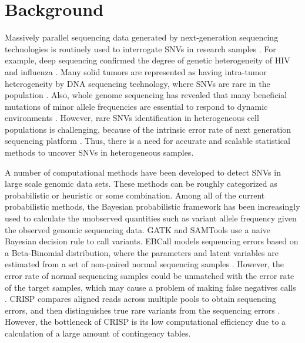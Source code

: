 \documentclass{bmcart}
\begin{document}

\section{Background}
Massively parallel sequencing data generated by next-generation sequencing technologies is routinely used to interrogate SNVs in research samples \cite{koboldt2013next}.
For example, deep sequencing confirmed the degree of genetic heterogeneity of HIV and influenza \cite{flaherty2011ultrasensitive, ghedin2011deep}.
Many solid tumors are represented as having intra-tumor heterogeneity by DNA sequencing technology, where SNVs are rare in the population \cite{navin2010inferring}.
Also, whole genome sequencing has revealed that many beneficial mutations of minor allele frequencies are essential to respond to dynamic environments \cite{kvitek2013whole}.
However, rare SNVs identification in heterogeneous cell populations is challenging, because of the intrinsic error rate of next generation sequencing platform \cite{shendure2008next}.
Thus, there is a need for accurate and scalable statistical methods to uncover SNVs in heterogeneous samples.

A number of computational methods have been developed to detect SNVs in large scale genomic data sets.
These methods can be roughly categorized as probabilistic or heuristic or some combination.
Among all of the current probabilistic methods, the Bayesian probabilistic framework has been increasingly used to calculate the unobserved quantities such as variant allele frequency given the observed genomic sequencing data.
GATK \cite{mckenna2010genome} and SAMTools \cite{li2009sequence} use a naive Bayesian decision rule to call variants.
EBCall models sequencing errors based on a Beta-Binomial distribution, where the parameters and latent variables are estimated from a set of non-paired normal sequencing samples \cite{shiraishi2013empirical}.
However, the error rate of normal sequencing samples could be unmatched with the error rate of the target samples, which may cause a problem of making false negatives calls \cite{wang2013detecting}.
CRISP compares aligned reads across multiple pools to obtain sequencing errors, and then distinguishes true rare variants from the sequencing errors \cite{bansal2010statistical}.
However, the bottleneck of CRISP is its low computational efficiency due to a calculation of a large amount of contingency tables.
\end{document}
